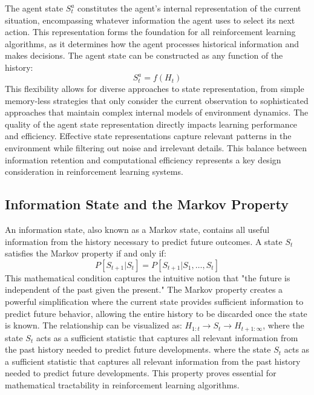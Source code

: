     The agent state $S_t^a$ constitutes the agent's internal representation of the current situation, encompassing whatever information the agent uses to select its next action. This representation forms the foundation for all reinforcement learning algorithms, as it determines how the agent processes historical information and makes decisions.
    The agent state can be constructed as any function of the history:
    \begin{equation}
    S_t^a = f(H_t)
    \end{equation} This flexibility allows for diverse approaches to state representation, from simple memory-less strategies that only consider the current observation to sophisticated approaches that maintain complex internal models of environment dynamics.
    The quality of the agent state representation directly impacts learning performance and efficiency. Effective state representations capture relevant patterns in the environment while filtering out noise and irrelevant details. This balance between information retention and computational efficiency represents a key design consideration in reinforcement learning systems.


\subsection{Information State and the Markov Property}

    An information state, also known as a Markov state, contains all useful information from the history necessary to predict future outcomes. A state $S_t$ satisfies the Markov property if and only if:
    \begin{equation}
         P[S_{t+1}|S_t] = P[S_{t+1}|S_1, \ldots, S_t]
    \end{equation}
    This mathematical condition captures the intuitive notion that "the future is independent of the past given the present." The Markov property creates a powerful simplification where the current state provides sufficient information to predict future behavior, allowing the entire history to be discarded once the state is known.
    The relationship can be visualized as: $H_{1:t} \rightarrow S_t \rightarrow H_{t+1:\infty}$, where the state $S_t$ acts as a sufficient statistic that captures all relevant information from the past history needed to predict future developments.     
    where the state $S_t$ acts as a sufficient statistic that captures all relevant information from the past history needed to predict future developments. This property proves essential for mathematical tractability in reinforcement learning algorithms.
    
